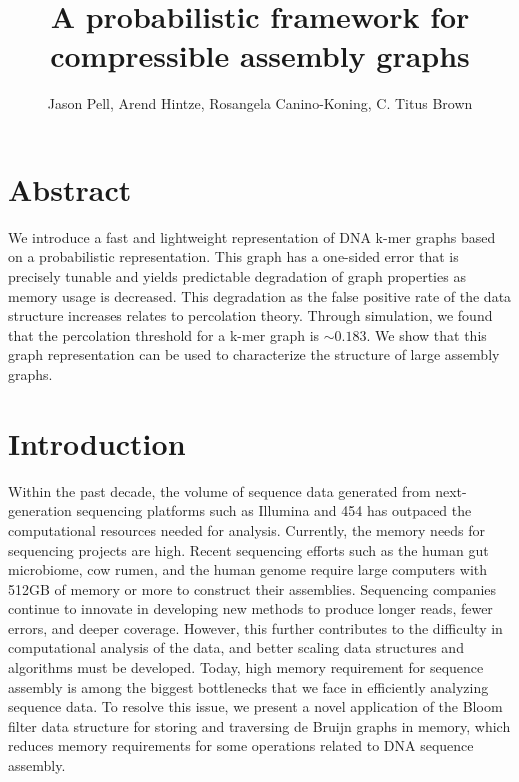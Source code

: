 \documentclass[12pt]{article} \usepackage{simplemargins}
\begin{document}
\title{A probabilistic framework for compressible assembly graphs}
\author{Jason Pell, Arend Hintze, Rosangela Canino-Koning, C. Titus Brown}

\maketitle

\section{Abstract}

We introduce a fast and lightweight representation of DNA k-mer graphs
based on a probabilistic representation.  This graph has a one-sided
error that is precisely tunable and yields predictable degradation of
graph properties as memory usage is decreased. This degradation as the false 
positive rate of the data structure increases relates to percolation theory. Through 
simulation, we found that the percolation threshold for a k-mer graph 
is $\sim 0.183$. We show that this
graph representation can be used to characterize the structure of
large assembly graphs.

\section{Introduction}

Within the past decade, the volume of sequence data generated
from next-generation sequencing platforms such as Illumina and 454
has outpaced the computational resources needed for
analysis. Currently, the memory needs for sequencing projects 
are high. Recent sequencing efforts such as the human gut
microbiome\cite{pmid20203603}, cow rumen\cite{pmid21273488}, and the 
human genome\cite{pmid21187386} require large computers with 512GB of memory
or more to construct their assemblies.  
Sequencing companies continue to innovate in developing new 
methods to produce longer reads, fewer errors, 
and deeper coverage. However, this further contributes 
to the difficulty in computational 
analysis of the data, and better scaling data structures and algorithms 
must be developed. Today, high memory requirement for sequence assembly is
among the biggest bottlenecks that we face in efficiently analyzing
sequence data. To resolve this issue, we present a novel application
of the Bloom filter data structure\cite{bloom} for storing and traversing de
Bruijn graphs in memory, which reduces memory requirements for some 
operations related to DNA sequence assembly.
\end{document}
